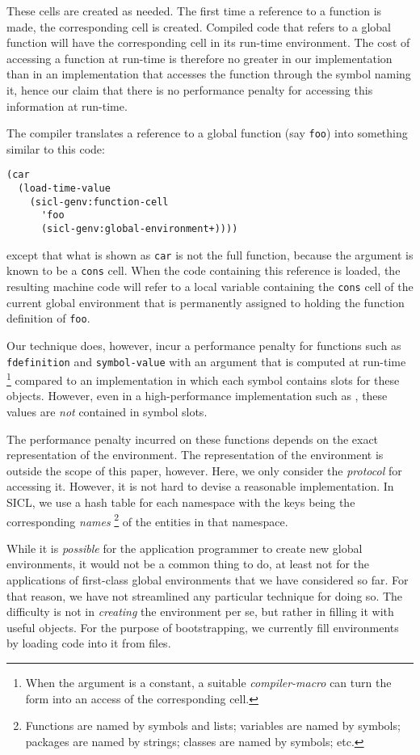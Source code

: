 These cells are created as needed.  The first time a reference to a
function is made, the corresponding cell is created.  Compiled code
that refers to a global function will have the corresponding cell in
its run-time environment.  The cost of accessing a function at
run-time is therefore no greater in our implementation than in an
implementation that accesses the function through the symbol naming
it, hence our claim that there is no performance penalty for accessing
this information at run-time.

The \sicl{} compiler translates a reference to a global function (say
\texttt{foo}) into something similar to this code:

{\small\begin{verbatim}
(car
  (load-time-value
    (sicl-genv:function-cell
      'foo
      (sicl-genv:global-environment+))))
\end{verbatim}}

except that what is shown as \texttt{car} is not the full
\commonlisp{} function, because the argument is known to be a
\texttt{cons} cell.  When the code containing this reference is
loaded, the resulting machine code will refer to a local variable
containing the \texttt{cons} cell of the current global environment
that is permanently assigned to holding the function definition of
\texttt{foo}.

Our technique does, however, incur a performance penalty for functions
such as \texttt{fdefinition} and \texttt{symbol-value} with an
argument that is computed at run-time%
\footnote{When the argument is a constant, a suitable
  \emph{compiler-macro} can turn the form into an access of the
  corresponding cell.}
compared to an implementation in which each symbol contains slots for
these objects.  However, even in a high-performance implementation such
as \sbcl{}, these values are \emph{not} contained in symbol slots.

The performance penalty incurred on these functions depends on the
exact representation of the environment.  The representation of the
environment is outside the scope of this paper, however.  Here, we
only consider the \emph{protocol} for accessing it.  However, it is
not hard to devise a reasonable implementation.  In SICL, we use a
hash table for each namespace with the keys being the corresponding
\emph{names}%
\footnote{Functions are named by symbols and lists; variables are
  named by symbols; packages are named by strings; classes are named
  by symbols; etc.}
of the entities in that namespace.

While it is \emph{possible} for the application programmer to create
new global environments, it would not be a common thing to do, at
least not for the applications of first-class global environments that
we have considered so far.  For that reason, we have not streamlined
any particular technique for doing so.  The difficulty is not in
\emph{creating} the environment per se, but rather in filling it with
useful objects.  For the purpose of bootstrapping, we currently fill
environments by loading code into it from files.
